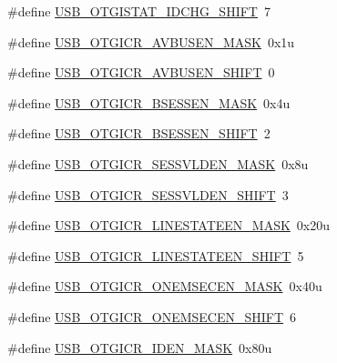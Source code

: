 \begin{DoxyCompactItemize}
\#define \hyperlink{group___u_s_b___register___masks_gac273f68643eb40324f598cb4a275b87b}{U\+S\+B\+\_\+\+O\+T\+G\+I\+S\+T\+A\+T\+\_\+\+I\+D\+C\+H\+G\+\_\+\+S\+H\+I\+FT}~7
\item 
\#define \hyperlink{group___u_s_b___register___masks_ga7754d512762167f81175b40ed5243050}{U\+S\+B\+\_\+\+O\+T\+G\+I\+C\+R\+\_\+\+A\+V\+B\+U\+S\+E\+N\+\_\+\+M\+A\+SK}~0x1u
\item 
\#define \hyperlink{group___u_s_b___register___masks_gac9ca8070fe9426a83bc59be69471edd3}{U\+S\+B\+\_\+\+O\+T\+G\+I\+C\+R\+\_\+\+A\+V\+B\+U\+S\+E\+N\+\_\+\+S\+H\+I\+FT}~0
\item 
\#define \hyperlink{group___u_s_b___register___masks_ga509dfbaf7a85ddbd9b7b61a1d5032cf1}{U\+S\+B\+\_\+\+O\+T\+G\+I\+C\+R\+\_\+\+B\+S\+E\+S\+S\+E\+N\+\_\+\+M\+A\+SK}~0x4u
\item 
\#define \hyperlink{group___u_s_b___register___masks_gad6d45208ed6411e439be457224176789}{U\+S\+B\+\_\+\+O\+T\+G\+I\+C\+R\+\_\+\+B\+S\+E\+S\+S\+E\+N\+\_\+\+S\+H\+I\+FT}~2
\item 
\#define \hyperlink{group___u_s_b___register___masks_ga35e32e6ed718719eb90a5aa7b8af10f3}{U\+S\+B\+\_\+\+O\+T\+G\+I\+C\+R\+\_\+\+S\+E\+S\+S\+V\+L\+D\+E\+N\+\_\+\+M\+A\+SK}~0x8u
\item 
\#define \hyperlink{group___u_s_b___register___masks_ga6f1a0dd83404b56be4be006b113f68d8}{U\+S\+B\+\_\+\+O\+T\+G\+I\+C\+R\+\_\+\+S\+E\+S\+S\+V\+L\+D\+E\+N\+\_\+\+S\+H\+I\+FT}~3
\item 
\#define \hyperlink{group___u_s_b___register___masks_gac9d12e9bdf0d60b52ea0b99c668630af}{U\+S\+B\+\_\+\+O\+T\+G\+I\+C\+R\+\_\+\+L\+I\+N\+E\+S\+T\+A\+T\+E\+E\+N\+\_\+\+M\+A\+SK}~0x20u
\item 
\#define \hyperlink{group___u_s_b___register___masks_ga1824eae0010a884c2b3bd425cfa2b389}{U\+S\+B\+\_\+\+O\+T\+G\+I\+C\+R\+\_\+\+L\+I\+N\+E\+S\+T\+A\+T\+E\+E\+N\+\_\+\+S\+H\+I\+FT}~5
\item 
\#define \hyperlink{group___u_s_b___register___masks_gac68531fd32d53520e1d1ccdd4cfae9ec}{U\+S\+B\+\_\+\+O\+T\+G\+I\+C\+R\+\_\+\+O\+N\+E\+M\+S\+E\+C\+E\+N\+\_\+\+M\+A\+SK}~0x40u
\item 
\#define \hyperlink{group___u_s_b___register___masks_ga29ccacd7b79d6d2df3b8743ccd1c467f}{U\+S\+B\+\_\+\+O\+T\+G\+I\+C\+R\+\_\+\+O\+N\+E\+M\+S\+E\+C\+E\+N\+\_\+\+S\+H\+I\+FT}~6
\item 
\#define \hyperlink{group___u_s_b___register___masks_gaa13997b88383cb1aec6f042ecdb94399}{U\+S\+B\+\_\+\+O\+T\+G\+I\+C\+R\+\_\+\+I\+D\+E\+N\+\_\+\+M\+A\+SK}~0x80u
\item 

\end{DoxyCompactItemize}
